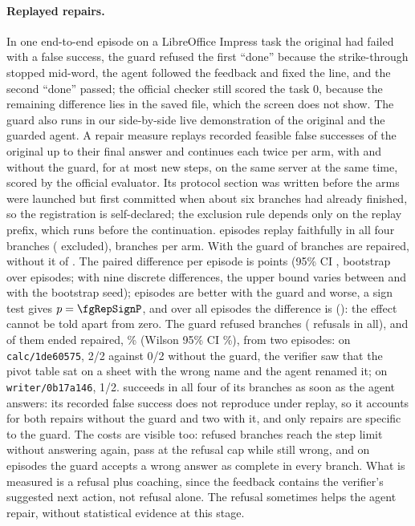 \paragraph{Replayed repairs.} In one end-to-end episode on a LibreOffice Impress task the original had failed with a false success, the guard refused the first ``done'' because the strike-through stopped mid-word, the agent followed the feedback and fixed the line, and the second ``done'' passed; the official checker still scored the task 0, because the remaining difference lies in the saved file, which the screen does not show. The guard also runs in our side-by-side live demonstration of the original and the guarded agent. A repair measure replays \fgRepairEpisodes{} recorded feasible false successes of the original up to their final answer and continues each twice per arm, with and without the guard, for at most \fgRepMaxSteps{} new steps, on the same server at the same time, scored by the official evaluator. Its protocol section was written before the arms were launched but first committed when about six branches had already finished, so the registration is self-declared; the exclusion rule depends only on the replay prefix, which runs before the continuation. \fgRepEpisodes{} episodes replay faithfully in all four branches (\fgRepExcluded{} excluded), \fgRepBranches{} branches per arm. With the guard \fgRepRepairedGuard{} of \fgRepBranches{} branches are repaired, without it \fgRepRepairedNog{} of \fgRepBranches. The paired difference per episode is \fgRepDiff{} points (95\% CI \fgRepDiffCi, bootstrap over episodes; with nine discrete differences, the upper bound varies between \fgRepDiffHiMin{} and \fgRepDiffHiMax{} with the bootstrap seed); \fgRepBetter{} episodes are better with the guard and \fgRepWorse{} worse, a sign test gives $p=\fgRepSignP$, and over all \fgRepEpisodesAll{} episodes the difference is \fgRepDiffAll{} (\fgRepDiffAllCi): the effect cannot be told apart from zero. The guard refused \fgRepRefused{} branches (\fgRepRefusals{} refusals in all), and \fgRepRefusedRepaired{} of them ended repaired, \fgRepRefusedRepairedPct\% (Wilson 95\% CI \fgRepRefusedRepairedCi\%), from two episodes: on \texttt{calc/1de60575}, 2/2 against 0/2 without the guard, the verifier saw that the pivot table sat on a sheet with the wrong name and the agent renamed it; on \texttt{writer/0b17a146}, 1/2. \texttt{\fgRepBothTask} succeeds in all four of its branches as soon as the agent answers: its recorded false success does not reproduce under replay, so it accounts for both repairs without the guard and two with it, and only \fgRepSpecific{} repairs are specific to the guard. The costs are visible too: \fgRepRefusedNoAnswer{} refused branches reach the step limit without answering again, \fgRepCapWrong{} pass at the refusal cap while still wrong, and on \fgRepWrongComplete{} episodes the guard accepts a wrong answer as complete in every branch. What is measured is a refusal plus coaching, since the feedback contains the verifier's suggested next action, not refusal alone. The refusal sometimes helps the agent repair, without statistical evidence at this stage. %